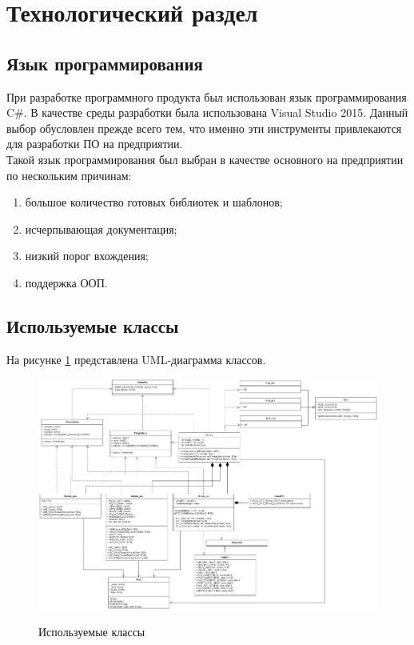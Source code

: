 \newpage
\section{Технологический раздел}
\subsection{Язык программирования}
	При разработке программного продукта был использован язык программирования C$\#$. \cite{c} В качестве среды разработки была использована Visual Studio 2015. \cite{VS2015} Данный выбор обусловлен прежде всего тем, что именно эти инструменты привлекаются для разработки ПО на предприятии. \\
	
	Такой язык программирования был выбран в качестве основного на предприятии по нескольким причинам:
	\begin{enumerate}
		\item [1)] большое количество готовых библиотек и шаблонов;
		\item [2)] исчерпывающая документация;
		\item [3)] низкий порог вхождения;
		\item [4)] поддержка ООП.
	\end{enumerate}

\subsection{Используемые классы}
	На рисунке \ref{fig16:image} представлена UML-диаграмма классов.
	
	\begin{figure}[ph!]
		\centering
		\begin{center}
			{\includegraphics[scale=0.39, angle=90]{schemes/practice.png}}
			\caption{Используемые классы}
			\label{fig16:image}
		\end{center}
	\end{figure}

